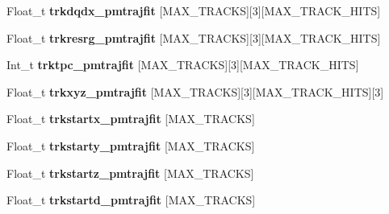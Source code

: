 \begin{DoxyCompactItemize}
\item 
\hypertarget{classanatree_a187b98e01b9145aaed5c8b07246d979b}{Float\-\_\-t {\bfseries trkdqdx\-\_\-pmtrajfit} \mbox{[}M\-A\-X\-\_\-\-T\-R\-A\-C\-K\-S\mbox{]}\mbox{[}3\mbox{]}\mbox{[}M\-A\-X\-\_\-\-T\-R\-A\-C\-K\-\_\-\-H\-I\-T\-S\mbox{]}}\label{classanatree_a187b98e01b9145aaed5c8b07246d979b}

\item 
\hypertarget{classanatree_aed6abd04eb5db5adb7c2c1431885545b}{Float\-\_\-t {\bfseries trkresrg\-\_\-pmtrajfit} \mbox{[}M\-A\-X\-\_\-\-T\-R\-A\-C\-K\-S\mbox{]}\mbox{[}3\mbox{]}\mbox{[}M\-A\-X\-\_\-\-T\-R\-A\-C\-K\-\_\-\-H\-I\-T\-S\mbox{]}}\label{classanatree_aed6abd04eb5db5adb7c2c1431885545b}

\item 
\hypertarget{classanatree_a992b438d7c09f5486fa6ff7bf2ef614f}{Int\-\_\-t {\bfseries trktpc\-\_\-pmtrajfit} \mbox{[}M\-A\-X\-\_\-\-T\-R\-A\-C\-K\-S\mbox{]}\mbox{[}3\mbox{]}\mbox{[}M\-A\-X\-\_\-\-T\-R\-A\-C\-K\-\_\-\-H\-I\-T\-S\mbox{]}}\label{classanatree_a992b438d7c09f5486fa6ff7bf2ef614f}

\item 
\hypertarget{classanatree_aff289f04ed93258fc373d3971a9f539a}{Float\-\_\-t {\bfseries trkxyz\-\_\-pmtrajfit} \mbox{[}M\-A\-X\-\_\-\-T\-R\-A\-C\-K\-S\mbox{]}\mbox{[}3\mbox{]}\mbox{[}M\-A\-X\-\_\-\-T\-R\-A\-C\-K\-\_\-\-H\-I\-T\-S\mbox{]}\mbox{[}3\mbox{]}}\label{classanatree_aff289f04ed93258fc373d3971a9f539a}

\item 
\hypertarget{classanatree_a1f9c28419a80caf6661ba03dbbbc2c34}{Float\-\_\-t {\bfseries trkstartx\-\_\-pmtrajfit} \mbox{[}M\-A\-X\-\_\-\-T\-R\-A\-C\-K\-S\mbox{]}}\label{classanatree_a1f9c28419a80caf6661ba03dbbbc2c34}

\item 
\hypertarget{classanatree_abc855e296a0eb442c8c73869566b1457}{Float\-\_\-t {\bfseries trkstarty\-\_\-pmtrajfit} \mbox{[}M\-A\-X\-\_\-\-T\-R\-A\-C\-K\-S\mbox{]}}\label{classanatree_abc855e296a0eb442c8c73869566b1457}

\item 
\hypertarget{classanatree_ab28d2a3bbb24a7dbe738f5161fbea855}{Float\-\_\-t {\bfseries trkstartz\-\_\-pmtrajfit} \mbox{[}M\-A\-X\-\_\-\-T\-R\-A\-C\-K\-S\mbox{]}}\label{classanatree_ab28d2a3bbb24a7dbe738f5161fbea855}

\item 
\hypertarget{classanatree_a4db9bab6145a3340cba8a78149876c0d}{Float\-\_\-t {\bfseries trkstartd\-\_\-pmtrajfit} \mbox{[}M\-A\-X\-\_\-\-T\-R\-A\-C\-K\-S\mbox{]}}\label{classanatree_a4db9bab6145a3340cba8a78149876c0d}


\end{DoxyCompactItemize}
